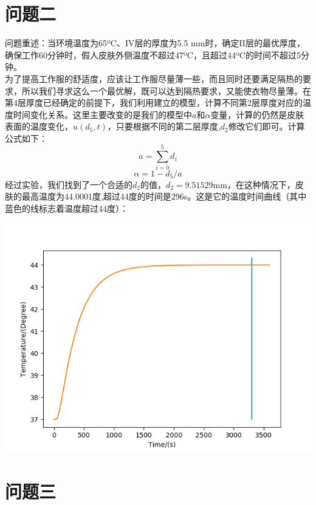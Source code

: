 \documentclass[bwprint]{cumcmthesis}
\begin{document}
\section{问题二}
\indent 问题重述：当环境温度为65ºC、IV层的厚度为5.5 mm时，确定II层的最优厚度，确保工作60分钟时，假人皮肤外侧温度不超过47ºC，且超过44ºC的时间不超过5分钟。\\
\indent 为了提高工作服的舒适度，应该让工作服尽量薄一些，而且同时还要满足隔热的要求，所以我们寻求这么一个最优解，既可以达到隔热要求，又能使衣物尽量薄。在第4层厚度已经确定的前提下，我们利用建立的模型，计算不同第2层厚度对应的温度时间变化关系。这里主要改变的是我们的模型中$a$和$\alpha$变量，计算的仍然是皮肤表面的温度变化，$u(d_5,t)$，只要根据不同的第二层厚度,$d_2$修改它们即可。计算公式如下：
\begin{equation}
    a = \sum_{i=0}^5 d_i
\end{equation}
\begin{equation}
    \alpha = 1-d_5/a
\end{equation}
\indent 经过实验，我们找到了一个合适的$d_2$的值，$d_2=9.51529$mm，在这种情况下，皮肤的最高温度为44.0001度,超过44度的时间是296s。这是它的温度时间曲线（其中蓝色的线标志着温度超过44度）：
\begin{flushleft}
    \includegraphics[scale=1]{Problem2.png}
\end{flushleft}

\section{问题三}
\end{document}
